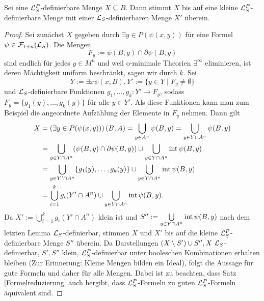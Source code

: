 \begin{theorem}
	Sei eine $\mathcal{L}^P_S$-definierbare Menge $X\subseteq B$. Dann stimmt $X$ bis auf eine kleine $\mathcal{L}^P_S$-definierbare Menge mit einer $\mathcal{L}_S$-definierbaren Menge $X'$ überein.
\end{theorem}
\begin{proof}
	Sei zunächst $X$ gegeben durch $\exists y\in P(\psi(x,y))$ für eine Formel $\psi\in\mathcal{F}_{1+n}(\mathcal{L}_S)$. Die Mengen $$F_y:=\psi(B,y)\cap\partial\psi(B,y)$$ sind endlich für jedes $y\in M^n$ und weil o-minimale Theorien $\exists^\infty$ eliminieren, ist deren Mächtigkeit uniform beschränkt, sagen wir durch $k$. Sei $$Y:=\exists x\psi(x,B),Y':=\{y\in Y\mid F_y\neq\emptyset\}$$ und $\mathcal{L}_S$-definierbare Funktionen $g_1,\dots,g_k:Y'\rightarrow F_y$, sodass $F_y=\{g_1(y),\dots,g_k(y)\}$ für alle $y\in Y'$. Als diese Funktionen kann man zum Beispiel die angeordnete Aufzählung der Elemente in $F_y$ nehmen. Dann gilt
	\begin{align*}
	X&=\left(\exists y\in P(\psi(x,y))\right)(B,A)=\bigcup\limits_{y\in A^n}\psi(B,y)=\bigcup\limits_{y\in Y\cap A^n}\psi(B,y)\\&=\bigcup\limits_{y\in Y\cap A^n}(\psi(B,y)\cap \partial\psi(B,y))\cup\bigcup\limits_{y\in Y\cap A^n}\operatorname{int}\psi(B,y)\\&=\bigcup\limits_{y\in Y'\cap A^n}\{g_1(y),\dots,g_k(y)\}\cup\bigcup\limits_{y\in Y\cap A^n}\operatorname{int}\psi(B,y)\\&=\bigcup\limits_{i=1}^kg_i(Y'\cap A^n)\cup \bigcup\limits_{y\in Y\cap A^n}\operatorname{int}\psi(B,y).
	\end{align*}
	Da $X':=\bigcup\limits_{i=1}^kg_i(Y'\cap A^n)$ klein ist und $S'':=\bigcup\limits_{y\in Y\cap A^n}\operatorname{int}\psi(B,y)$ nach dem letzten Lemma $\mathcal{L}_S$-definierbar, stimmen $X$ und $X'$ bis auf die kleine $\mathcal{L}^P_S$-definierbare Menge $S''$ überein. Da Darstellungen \glqq{}$(X\setminus  S')\cup S'',X\ \lingua_S$-definierbar, $S',S''$ klein, $\mathcal{L}^P_S$-definierbar\grqq{} unter booleschen Kombinationen erhalten bleiben (Zur Erinnerung: Kleine Mengen bilden ein Ideal), folgt die Aussage für gute Formeln und daher für alle Mengen. Dabei ist zu beachten, dass Satz \ref{Formelreduzierung} auch hergibt, dass $\mathcal{L}^P_S$-Formeln zu guten $\mathcal{L}^P_S$-Formeln äquivalent sind.
\end{proof}

